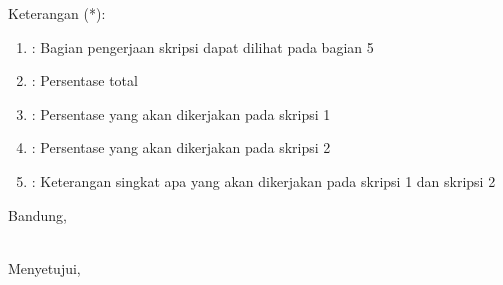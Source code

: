 \documentclass[a4paper,twoside]{article}
\begin{document}
Keterangan (*):
\begin{enumerate}
	\item : Bagian pengerjaan skripsi dapat dilihat pada bagian 5 
	\item : Persentase total
	\item : Persentase yang akan dikerjakan pada skripsi 1
	\item : Persentase yang akan dikerjakan pada skripsi 2
	\item : Keterangan singkat apa yang akan dikerjakan pada skripsi 1 dan skripsi 2
\end{enumerate}


\vspace{1cm}
\centering Bandung, \tanggal\\
\vspace{2cm} \nama \\ 
\vspace{1cm}


Menyetujui, \\
\end{document}
